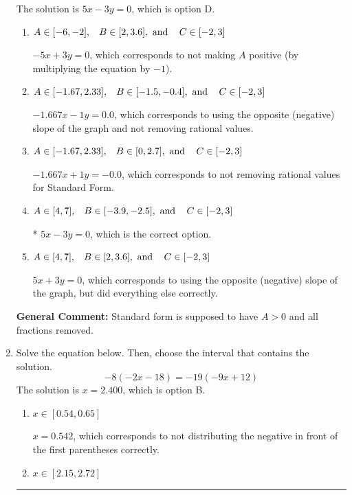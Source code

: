\documentclass{extbook}[14pt]
\newcommand{\litem}[1]{\item #1

\rule{\textwidth}{0.4pt}}
\begin{document}
\begin{enumerate}
{The solution is \( 5x - 3y = 0 \), which is option D.\begin{enumerate}[label=\Alph*.]
\item \( A \in [-6, -2], \hspace{3mm} B \in [2, 3.6], \text{ and } \hspace{3mm} C \in [-2, 3] \)

 $-5x + 3y = 0$, which corresponds to not making $A$ positive (by multiplying the equation by $-1$).
\item \( A \in [-1.67, 2.33], \hspace{3mm} B \in [-1.5, -0.4], \text{ and } \hspace{3mm} C \in [-2, 3] \)

 $-1.667x - 1y = 0.0$, which corresponds to using the opposite (negative) slope of the graph and not removing rational values.
\item \( A \in [-1.67, 2.33], \hspace{3mm} B \in [0, 2.7], \text{ and } \hspace{3mm} C \in [-2, 3] \)

 $-1.667x + 1y = -0.0$, which corresponds to not removing rational values for Standard Form.
\item \( A \in [4, 7], \hspace{3mm} B \in [-3.9, -2.5], \text{ and } \hspace{3mm} C \in [-2, 3] \)

* $5x - 3y = 0$, which is the correct option.
\item \( A \in [4, 7], \hspace{3mm} B \in [2, 3.6], \text{ and } \hspace{3mm} C \in [-2, 3] \)

 $5x + 3y = 0$, which corresponds to using the opposite (negative) slope of the graph, but did everything else correctly.
\end{enumerate}

\textbf{General Comment:} Standard form is supposed to have $A > 0$ and all fractions removed.
}
\litem{
Solve the equation below. Then, choose the interval that contains the solution.
\[ -8(-2x -18) = -19(-9x + 12) \]The solution is \( x = 2.400 \), which is option B.\begin{enumerate}[label=\Alph*.]
\item \( x \in [0.54, 0.65] \)

$x = 0.542$, which corresponds to not distributing the negative in front of the first parentheses correctly.
\item \( x \in [2.15, 2.72] \)


\end{enumerate}}
\end{enumerate}
\end{document}
